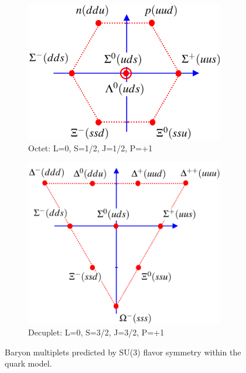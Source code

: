 \begin{figure}
\centering
\begin{subfigure}[b]{0.45\textwidth}
\includegraphics[width=0.95\textwidth]{figs/baryonoctet.png}
\caption{Octet: L=0, S=1/2, J=1/2, P=+1}
\end{subfigure}
\begin{subfigure}[b]{0.425\textwidth}
\includegraphics[width=0.95\textwidth]{figs/baryondecuplet.png}
\caption{Decuplet: L=0, S=3/2, J=3/2, P=+1}
\end{subfigure}
\caption[Baryon multiplets predicted by SU(3) flavor symmetry within the quark model.]{Baryon multiplets predicted by SU(3) flavor symmetry within the quark model. \cite{thomsonpics}}
\label{fig:su3baryon}
\end{figure}

